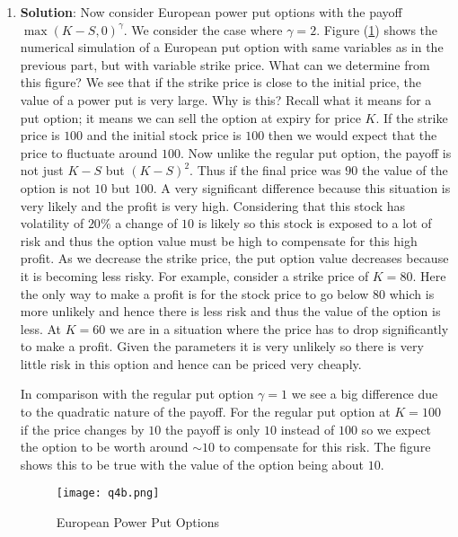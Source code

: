 \documentclass[10pt,english]{article}
\theoremstyle{plain}
\begin{document}
\begin{enumerate}
\begin{enumerate}
\item \textbf{Solution}: Now consider European power put options with the payoff $\max(K-S,0)^{\gamma}$. We consider the case where $\gamma=2$. Figure (\ref{pp}) shows the numerical simulation of a European put option with same variables as in the previous part, but with variable strike price. What can we determine from this figure? We see that if the strike price is close to the initial price, the value of a power put is very large. Why is this? Recall what it means for a put option; it means we can sell the option at expiry for price $K$. If the strike price is $100$ and the initial stock price is $100$ then we would expect that the price to fluctuate around $100$. Now unlike the regular put option, the payoff is not just $K-S$ but $(K-S)^{2}$. Thus if the final price was $90$ the value of the option is not $10$ but $100$. A very significant difference because this situation is very likely and the profit is very high. Considering that this stock has volatility of $20\%$ a change of $10$ is likely so  this stock is exposed to a lot of risk and thus the option value must be high to compensate for this high profit. As we decrease the strike price, the put option value decreases because it is becoming less risky. For example, consider a strike price of $K=80$. Here the only way to make a profit is for the stock price to go below $80$ which is more unlikely and hence there is less risk and thus the value of the option is less. At $K=60$ we are in a situation where the price has to drop significantly to make a profit. Given the parameters it is very unlikely so there is very little risk in this option and hence can be priced very cheaply.

In comparison with the regular put option $\gamma=1$ we see a big difference due to the quadratic nature of the payoff. For the regular put option at $K=100$ if the price changes by $10$ the payoff is only $10$ instead of $100$ so we expect the option to be worth around $\sim 10$ to compensate for this risk. The figure shows this to be true with the value of the option being about $10$. 
\begin{figure}

\begin{center}
\texttt{[image: q4b.png]}
\end{center}
\caption{European Power Put Options}\label{pp}
\end{figure}
\end{enumerate}


\end{enumerate}
\end{document}
